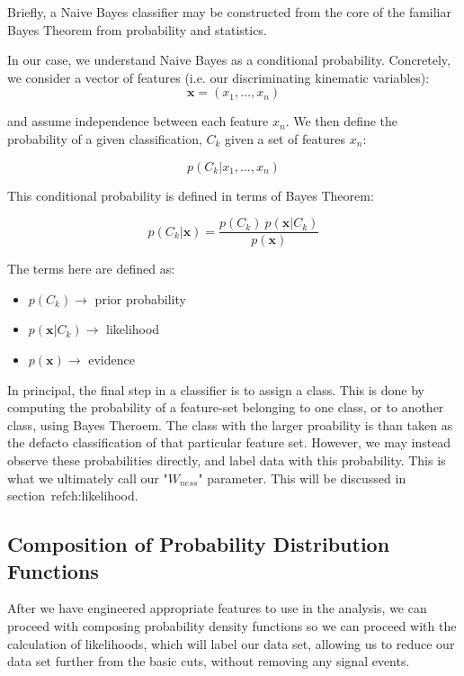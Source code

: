 Briefly, a Naive Bayes classifier may be constructed from the core of the
familiar Bayes Theorem from probability and statistics.

In our case, we understand Naive Bayes as a conditional probability. Concretely,
we consider a vector of features (i.e. our discriminating kinematic variables):
\begin{equation}
	\label{eq:feature_vector}
\mathbf{x} = (x_1, \dots, x_n)
\end{equation}

and assume independence between each feature $x_n$. We then define the
probability of a given classification, $C_k$ given a set of features $x_n$:

\begin{equation}
	\label{eq:cond_probabilty}
p(C_k \vert x_1, \dots, x_n)
\end{equation}

This conditional probability is defined in terms of Bayes Theorem:

\begin{equation}
	\label{eq:bayes_theorm}
p(C_k \vert \mathbf{x}) = \frac{p(C_k) \ p(\mathbf{x} \vert C_k)}{p(\mathbf{x})}
\end{equation}

The terms here are defined as:
\begin{itemize}
	\item $p(C_k)\rightarrow$ prior probability
	\item $p(\mathbf{x} \vert C_k)\rightarrow$ likelihood
	\item $p(\mathbf{x})\rightarrow$ evidence
\end{itemize}

In principal, the final step in a classifier is to assign a class. This is done
by computing the probability of a feature-set belonging to one class, or to
another class, using Bayes Theroem. The class with the larger proability is than
taken as the defacto classification of that particular feature set. However, we
may instead observe these probabilities directly, and label data with this
probability. This is what we ultimately call our "$W_{ness}$" parameter. This
will be discussed in section~ref{ch:likelihood}.

\subsection{Composition of Probability Distribution Functions}
After we have engineered appropriate features to use in the analysis, we can
proceed with composing probability density functions so we can proceed with the
calculation of likelihoods, which will label our data set, allowing us to reduce
our data set further from the basic cuts, without removing any signal events.


